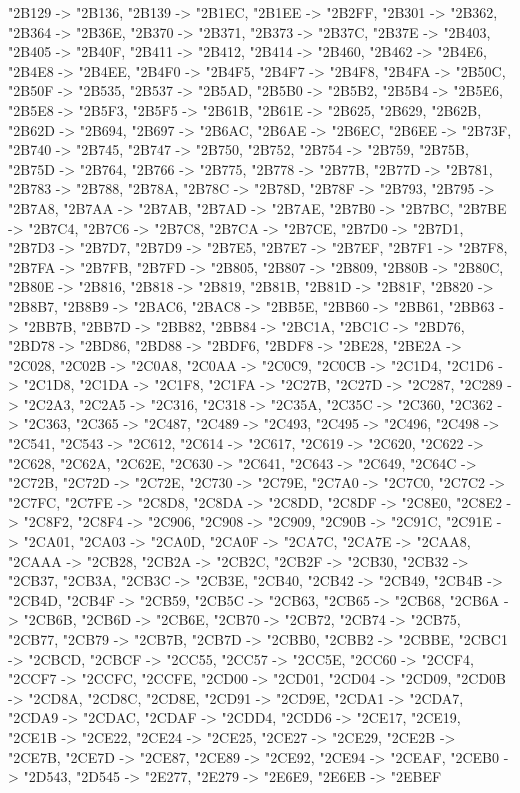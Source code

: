 {  "2B129 -> "2B136,
  "2B139 -> "2B1EC,
  "2B1EE -> "2B2FF,
  "2B301 -> "2B362,
  "2B364 -> "2B36E,
  "2B370 -> "2B371,
  "2B373 -> "2B37C,
  "2B37E -> "2B403,
  "2B405 -> "2B40F,
  "2B411 -> "2B412,
  "2B414 -> "2B460,
  "2B462 -> "2B4E6,
  "2B4E8 -> "2B4EE,
  "2B4F0 -> "2B4F5,
  "2B4F7 -> "2B4F8,
  "2B4FA -> "2B50C,
  "2B50F -> "2B535,
  "2B537 -> "2B5AD,
  "2B5B0 -> "2B5B2,
  "2B5B4 -> "2B5E6,
  "2B5E8 -> "2B5F3,
  "2B5F5 -> "2B61B,
  "2B61E -> "2B625,
  "2B629,
  "2B62B,
  "2B62D -> "2B694,
  "2B697 -> "2B6AC,
  "2B6AE -> "2B6EC,
  "2B6EE -> "2B73F,
  "2B740 -> "2B745,
  "2B747 -> "2B750,
  "2B752,
  "2B754 -> "2B759,
  "2B75B,
  "2B75D -> "2B764,
  "2B766 -> "2B775,
  "2B778 -> "2B77B,
  "2B77D -> "2B781,
  "2B783 -> "2B788,
  "2B78A,
  "2B78C -> "2B78D,
  "2B78F -> "2B793,
  "2B795 -> "2B7A8,
  "2B7AA -> "2B7AB,
  "2B7AD -> "2B7AE,
  "2B7B0 -> "2B7BC,
  "2B7BE -> "2B7C4,
  "2B7C6 -> "2B7C8,
  "2B7CA -> "2B7CE,
  "2B7D0 -> "2B7D1,
  "2B7D3 -> "2B7D7,
  "2B7D9 -> "2B7E5,
  "2B7E7 -> "2B7EF,
  "2B7F1 -> "2B7F8,
  "2B7FA -> "2B7FB,
  "2B7FD -> "2B805,
  "2B807 -> "2B809,
  "2B80B -> "2B80C,
  "2B80E -> "2B816,
  "2B818 -> "2B819,
  "2B81B,
  "2B81D -> "2B81F,
  "2B820 -> "2B8B7,
  "2B8B9 -> "2BAC6,
  "2BAC8 -> "2BB5E,
  "2BB60 -> "2BB61,
  "2BB63 -> "2BB7B,
  "2BB7D -> "2BB82,
  "2BB84 -> "2BC1A,
  "2BC1C -> "2BD76,
  "2BD78 -> "2BD86,
  "2BD88 -> "2BDF6,
  "2BDF8 -> "2BE28,
  "2BE2A -> "2C028,
  "2C02B -> "2C0A8,
  "2C0AA -> "2C0C9,
  "2C0CB -> "2C1D4,
  "2C1D6 -> "2C1D8,
  "2C1DA -> "2C1F8,
  "2C1FA -> "2C27B,
  "2C27D -> "2C287,
  "2C289 -> "2C2A3,
  "2C2A5 -> "2C316,
  "2C318 -> "2C35A,
  "2C35C -> "2C360,
  "2C362 -> "2C363,
  "2C365 -> "2C487,
  "2C489 -> "2C493,
  "2C495 -> "2C496,
  "2C498 -> "2C541,
  "2C543 -> "2C612,
  "2C614 -> "2C617,
  "2C619 -> "2C620,
  "2C622 -> "2C628,
  "2C62A,
  "2C62E,
  "2C630 -> "2C641,
  "2C643 -> "2C649,
  "2C64C -> "2C72B,
  "2C72D -> "2C72E,
  "2C730 -> "2C79E,
  "2C7A0 -> "2C7C0,
  "2C7C2 -> "2C7FC,
  "2C7FE -> "2C8D8,
  "2C8DA -> "2C8DD,
  "2C8DF -> "2C8E0,
  "2C8E2 -> "2C8F2,
  "2C8F4 -> "2C906,
  "2C908 -> "2C909,
  "2C90B -> "2C91C,
  "2C91E -> "2CA01,
  "2CA03 -> "2CA0D,
  "2CA0F -> "2CA7C,
  "2CA7E -> "2CAA8,
  "2CAAA -> "2CB28,
  "2CB2A -> "2CB2C,
  "2CB2F -> "2CB30,
  "2CB32 -> "2CB37,
  "2CB3A,
  "2CB3C -> "2CB3E,
  "2CB40,
  "2CB42 -> "2CB49,
  "2CB4B -> "2CB4D,
  "2CB4F -> "2CB59,
  "2CB5C -> "2CB63,
  "2CB65 -> "2CB68,
  "2CB6A -> "2CB6B,
  "2CB6D -> "2CB6E,
  "2CB70 -> "2CB72,
  "2CB74 -> "2CB75,
  "2CB77,
  "2CB79 -> "2CB7B,
  "2CB7D -> "2CBB0,
  "2CBB2 -> "2CBBE,
  "2CBC1 -> "2CBCD,
  "2CBCF -> "2CC55,
  "2CC57 -> "2CC5E,
  "2CC60 -> "2CCF4,
  "2CCF7 -> "2CCFC,
  "2CCFE,
  "2CD00 -> "2CD01,
  "2CD04 -> "2CD09,
  "2CD0B -> "2CD8A,
  "2CD8C,
  "2CD8E,
  "2CD91 -> "2CD9E,
  "2CDA1 -> "2CDA7,
  "2CDA9 -> "2CDAC,
  "2CDAF -> "2CDD4,
  "2CDD6 -> "2CE17,
  "2CE19,
  "2CE1B -> "2CE22,
  "2CE24 -> "2CE25,
  "2CE27 -> "2CE29,
  "2CE2B -> "2CE7B,
  "2CE7D -> "2CE87,
  "2CE89 -> "2CE92,
  "2CE94 -> "2CEAF,
  "2CEB0 -> "2D543,
  "2D545 -> "2E277,
  "2E279 -> "2E6E9,
  "2E6EB -> "2EBEF
}